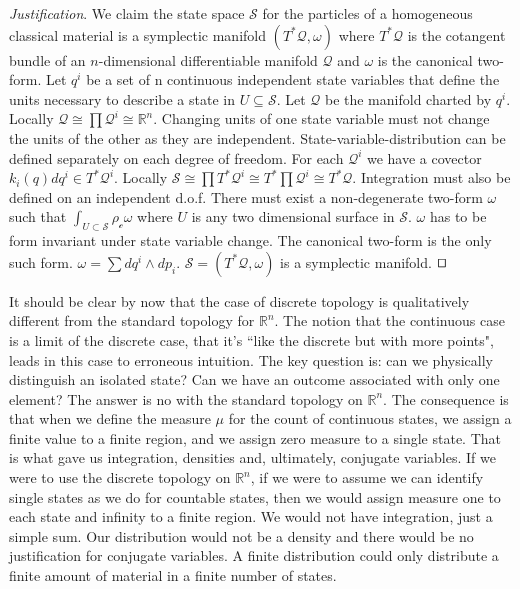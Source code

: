 \documentclass[smallextended]{svjour3}
\numberwithin{equation}{section}
\newenvironment{justification}{\emph{Justification}.}{\hfill\(\qed\)}
\theoremstyle{definition}
\newenvironment{justification}{\emph{Justification}.}{\qed}
\begin{document}
\begin{justification}
	We claim the state space $\mathcal{S}$ for the particles of a homogeneous classical material is a symplectic manifold $(T^*\mathcal{Q}, \omega)$ where $T^*\mathcal{Q}$ is the cotangent bundle of an $n$-dimensional differentiable manifold $\mathcal{Q}$ and $\omega$ is the canonical two-form. Let $q^i$ be a set of n continuous independent state variables that define the units necessary to describe a state in $U \subseteq \mathcal{S}$. Let $\mathcal{Q}$ be the manifold charted by $q^i$. Locally $\mathcal{Q} \cong \prod \mathcal{Q}^i \cong \mathbb{R}^n$. Changing units of one state variable must not change the units of the other as they are independent. State-variable-distribution can  be defined separately on each degree of freedom. For each $\mathcal{Q}^i$ we have a covector $k_i(q) dq^i \in T^*\mathcal{Q}^i$. Locally $\mathcal{S} \cong \prod T^*\mathcal{Q}^i \cong T^* \prod \mathcal{Q}^i \cong T^* \mathcal{Q}$. Integration must also be defined on an independent d.o.f. There must exist a non-degenerate two-form $\omega$ such that $\int_{U \subset \mathcal{S}} \rho_\mathcal{c} \omega$ where $U$ is any two dimensional surface in $\mathcal{S}$. $\omega$ has to be form invariant under state variable change. The canonical two-form is the only such form. $\omega = \sum dq^i \wedge dp_i$. $\mathcal{S} = (T^*\mathcal{Q}, \omega)$ is a symplectic manifold.
\end{justification}

It should be clear by now that the case of discrete topology is qualitatively different from the standard topology for $\mathbb{R}^n$. The notion that the continuous case is a limit of the discrete case, that it's ``like the discrete but with more points", leads in this case to erroneous intuition. The key question is: can we physically distinguish an isolated state? Can we have an outcome associated with only one element? The answer is no with the standard topology on $\mathbb{R}^n$. The consequence is that when we define the measure $\mu$ for the count of continuous states, we assign a finite value to a finite region, and we assign zero measure to a single state. That is what gave us integration, densities and, ultimately, conjugate variables. If we were to use the discrete topology on $\mathbb{R}^n$, if we were to assume we can identify single states as we do for countable states, then we would assign measure one to each state and infinity to a finite region. We would not have integration, just a simple sum. Our distribution would not be a density and there would be no justification for conjugate variables. A finite distribution could only distribute a finite amount of material in a finite number of states.
\end{document}
